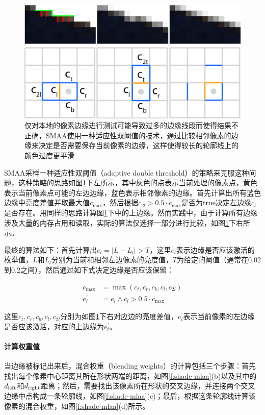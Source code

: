 \begin{figure}
\sidecaption
	\includegraphics[width=.65\textwidth]{figures/shade/local-contrast-adaptation}
	\caption{仅对本地的像素边缘进行测试可能导致过多的边缘线段而使得结果不正确，SMAA使用一种适应性双阈值的技术，通过比较相邻像素的边缘来决定是否需要保存当前像素的边缘，这样使得较长的轮廓线上的颜色过度更平滑}
	\label{f:shade-local-contrast-adaptation}
\end{figure}

SMAA采样一种适应性双阈值（adaptive double threshold）的策略来克服这种问题，这种策略的思路如图\ref{f:shade-local-contrast-adaptation}下左所示，其中灰色的点表示当前处理的像素点，黄色表示当前像素点可能的左边边缘，蓝色表示相邻像素的边缘。首先计算出所有蓝色边缘中亮度差值并取最大值$c_{\max}$，然后根据$c_{2l}>0.5\cdot c_{\max}$是否为true决定左边缘$c_l$是否存在。用同样的思路计算图\ref{f:shade-local-contrast-adaptation}下中的上边缘。然而实践中，由于计算所有边缘涉及大量的内存占用和读取，实际的算法仅选择一部分进行比较，如图\ref{f:shade-local-contrast-adaptation}下右所示。

最终的算法如下：首先计算出$e_l=|L-L_l|>T$，这里$e_l$表示边缘是否应该激活的枚举值，$L$和$L_l$分别为当前和相邻左边像素的亮度值，$T$为给定的阈值（通常在0.02到0.2之间），然后通过如下式决定边缘是否应该保留：

\begin{equation}
	\begin{aligned}
		c_{\max}&=\max(c_t,c_r,c_b,c_l,c_{2l})\\
		e^{'}_l&=e_l\wedge c_l>0.5\cdot c_{\max}
	\end{aligned}
\end{equation}

这里$c_t,c_r,c_b,c_l,c_{2l}$分别为如图\ref{f:shade-local-contrast-adaptation}下右对应边的亮度差值，${e}^{'}_l$表示当前像素的左边缘是否应该激活，对应的上边缘为${e}^{'}_t$。






\paragraph{计算权重值}
当边缘被标记出来后，混合权重（blending weights）的计算包括三个步骤：首先找出每个像素中心距离其所在形状两端的距离，如图\ref{f:shade-mlaa}(b)以及其中的$d_{\rm left}$和$d_{\rm right}$距离；然后，需要找出该像素所在形状的交叉边缘，并连接两个交叉边缘中点构成一条轮廓线，如图\ref{f:shade-mlaa}(c)；最后，根据这条轮廓线计算该像素的混合权重，如图\ref{f:shade-mlaa}(d)所示。

